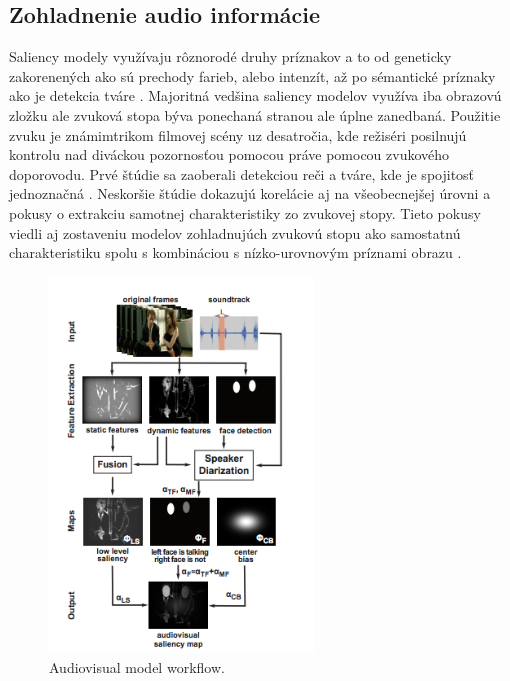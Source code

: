 \subsection{Zohladnenie audio informácie}
Saliency modely využívaju rôznorodé druhy príznakov a to od geneticky zakorenených ako sú prechody farieb, alebo intenzít, až po sémantické príznaky ako je detekcia tváre \cite{salient-faces}. Majoritná vedšina saliency modelov využíva iba obrazovú zložku ale zvuková stopa býva ponechaná stranou ale úplne zanedbaná. Použitie zvuku je známimtrikom filmovej scény uz desatročia, kde režiséri posilnujú kontrolu nad diváckou pozornosťou pomocou práve pomocou zvukového doporovodu. Prvé štúdie sa zaoberali detekciou reči a tváre, kde je spojitosť jednoznačná \cite{sound-1}. Neskoršie štúdie dokazujú korelácie aj na všeobecnejšej úrovni a pokusy o extrakciu samotnej charakteristiky zo zvukovej stopy\cite{sound-coutrot-1}. Tieto pokusy viedli aj zostaveniu modelov zohladnujúch zvukovú stopu ako samostatnú charakteristiku spolu s kombináciou s nízko-urovnovým príznami obrazu \cite{sound-courot-2}.

\begin{figure}
\includegraphics[width=7cm]{pics/courot-1.png}
\caption{Audiovisual model workflow.\cite{sound-courot-2}}\label{wrap-fig:1}
\end{figure}

